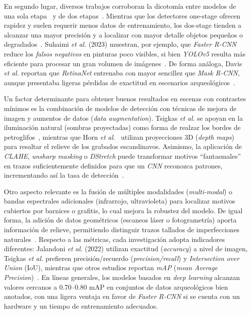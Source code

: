 En segundo lugar, diversos trabajos corroboran la dicotomía entre modelos de una sola etapa~\cite{yolov5,lin2017focal} y de dos etapas~\cite{ren2015faster}.
Mientras que los detectores one-stage ofrecen rapidez y suelen requerir menos datos de entrenamiento, los dos-stage tienden a alcanzar una mayor precisión y a localizar con mayor detalle objetos pequeños o degradados~\cite{davis2021,suhaimi2023}.
Suhaimi \textit{et al.} (2023) muestran, por ejemplo, que \textit{Faster R-CNN} reduce los \emph{falsos negativos} en pinturas poco visibles, si bien \textit{YOLOv5} resulta más eficiente para procesar un gran volumen de imágenes~\cite{suhaimi2023}.
De forma análoga, Davis \textit{et al.} reportan que \textit{RetinaNet} entrenaba con mayor sencillez que \textit{Mask R-CNN}, aunque presentaba ligeras pérdidas de exactitud en escenarios arqueológicos~\cite{davis2021}.

Un factor determinante para obtener buenos resultados en escenas con contrastes mínimos es la combinación de modelos de detección con técnicas de mejora de imagen y aumentos de datos (\textit{data augmentation}).
Tsigkas \textit{et al.} se apoyan en la iluminación natural (sombras proyectadas) como forma de realzar los bordes de petroglifos~\cite{tsigkas2020}, mientras que Horn \textit{et al.}~\cite{horn2022} utilizan proyecciones 3D (\textit{depth maps}) para resaltar el relieve de los grabados escandinavos. Asimismo, la aplicación de \textit{CLAHE}, \textit{unsharp masking} o \textit{DStretch} puede transformar motivos “fantasmales” en trazos suficientemente definidos para que un \textit{CNN} reconozca patrones, incrementando así la tasa de detección~\cite{suhaimi2023,davis2021}.

Otro aspecto relevante es la fusión de múltiples modalidades (\textit{multi-modal}) o bandas espectrales adicionales (infrarrojo, ultravioleta) para localizar motivos cubiertos por barnices o grafitis, lo cual mejora la robustez del modelo.
De igual forma, la adición de datos geométricos (escaneos láser o fotogrametría) aporta información de relieve, permitiendo distinguir trazos tallados de imperfecciones naturales~\cite{horn2022}.
Respecto a las métricas, cada investigación adopta indicadores diferentes: Jalandoni \textit{et al.} (2022) utilizan exactitud (\textit{accuracy}) a nivel de imagen, Tsigkas \textit{et al.} prefieren precisión/recuerdo (\textit{precision/recall}) y \textit{Intersection over Union} (IoU), mientras que otros estudios reportan \textit{mAP} (\textit{mean Average Precision})~\cite{jalandoni2022,tsigkas2020,davis2021}.
En líneas generales, los modelos basados en \textit{deep learning} alcanzan valores cercanos a 0.70–0.80 mAP en conjuntos de datos arqueológicos bien anotados, con una ligera ventaja en favor de \textit{Faster R-CNN} si se cuenta con un hardware y un tiempo de entrenamiento adecuados.

